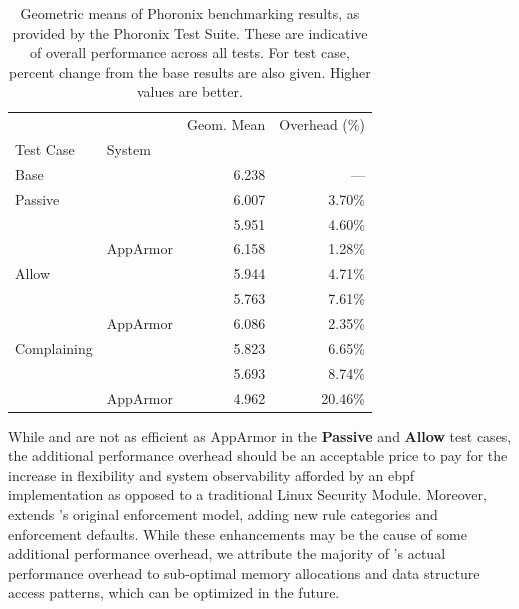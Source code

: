 \begin{table}[ht]
  \centering
  \footnotesize
  \caption[Geometric means of Phoronix benchmarking results]{
    Geometric means of Phoronix benchmarking results, as provided by the Phoronix Test
    Suite. These are indicative of overall performance across all tests. For test case,
    percent change from the base results are also given. Higher values are better.
  }%
  \label{tab:phoronix-geometric}
  \begin{tabular}{llrr}
  \toprule
             &               & Geom. Mean & Overhead (\%)\\
   Test Case & System        &            &              \\
   \midrule
   Base      &               & 6.238          & --- \\
   \cline{1-4}
   Passive   & \bpfbox{}     & 6.007          & 3.70\% \\
             & \bpfcontain{} & 5.951          & 4.60\% \\
             & AppArmor      & 6.158          & 1.28\% \\
   \cline{1-4}
   Allow     & \bpfbox{}     & 5.944          & 4.71\% \\
             & \bpfcontain{} & 5.763          & 7.61\% \\
             & AppArmor      & 6.086          & 2.35\% \\
   \cline{1-4}
   Complaining  & \bpfbox{}     & 5.823          & 6.65\% \\
             & \bpfcontain{} & 5.693          & 8.74\% \\
             & AppArmor      & 4.962          & 20.46\% \\
  \bottomrule
  \end{tabular}
\end{table}

While \bpfbox{} and \bpfcontain{} are not as efficient as AppArmor in the \textbf{Passive}
and \textbf{Allow}  test cases, the additional performance overhead should be an
acceptable price to pay for the increase in flexibility and system observability afforded
by an \gls{ebpf} implementation as opposed to a traditional Linux Security Module.
Moreover, \bpfcontain{} extends \bpfbox{}'s original enforcement model, adding new rule categories
and enforcement defaults. While these enhancements may be the cause of some additional
performance overhead, we attribute the majority of \bpfcontain{}'s actual performance
overhead to sub-optimal memory allocations and data structure access patterns, which can
be optimized in the future.

